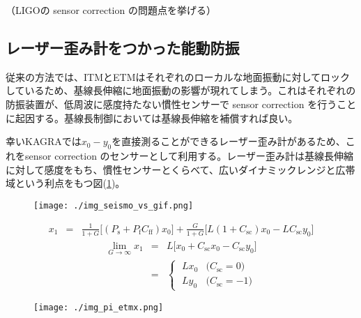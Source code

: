 \documentclass[a4paper,12pt]{jsarticle}
\begin{document}
（LIGOの sensor correction の問題点を挙げる）


\subsection{レーザー歪み計をつかった能動防振}
従来の方法では、ITMとETMはそれぞれのローカルな地面振動に対してロックしているため、基線長伸縮に地面振動の影響が現れてしまう。これはそれぞれの防振装置が、低周波に感度持たない慣性センサーで sensor correction を行うことに起因する。基線長制御においては基線長伸縮を補償すれば良い。

幸いKAGRAでは$x_0-y_0$を直接測ることができるレーザー歪み計\cite{araya2017design}があるため、これをsensor correction のセンサーとして利用する。レーザー歪み計は基線長伸縮に対して感度をもち、慣性センサーとくらべて、広いダイナミックレンジと広帯域という利点をもつ図(\ref{img:img_seismo_vs_gif})。

\begin{figure}[H]
  \begin{center}
    \texttt{[image: ./img\_seismo\_vs\_gif.png]}
  \end{center}
  \caption{}\label{img:img_seismo_vs_gif}
\end{figure}



\begin{eqnarray}
  x_1 &=& \frac{1}{1+G}\Biggl[(P_{\mathrm{s}}+P_{\mathrm{f}}C_{\mathrm{ff}})x_0\Biggl]
  + \frac{G}{1+G}\Biggl[L(1+C_{\mathrm{sc}})x_0 - LC_{\mathrm{sc}}y_0\Biggl]
\end{eqnarray}
\begin{eqnarray}\label{eq:eq10}
  \lim_{G \to \infty} x_{1} &=& L\Biggl[x_0+C_{\mathrm{sc}}x_0-C_{\mathrm{sc}}y_0\Biggl] \\
  &=&  
  \begin{cases}\label{eq:eq11}
    \; Lx_{0} & \text{($C_{\mathrm{sc}}=0$)}\\
    \; Ly_{0} & \text{($C_{\mathrm{sc}}=-1$)} 
  \end{cases}  
\end{eqnarray}


\begin{figure}[H]
  \begin{center}
    \texttt{[image: ./img\_pi\_etmx.png]}
  \end{center}
  \caption{}\label{img:img_pi_etmx}
\end{figure}
\end{document}

